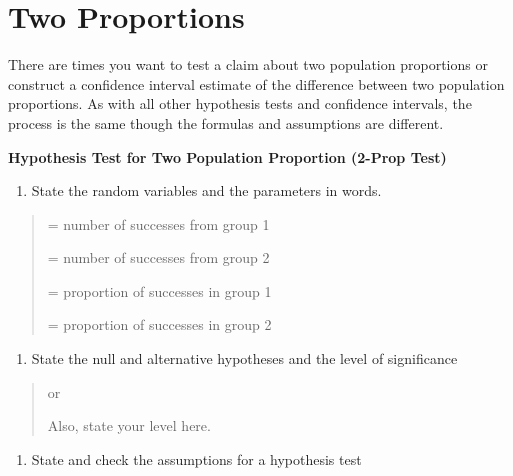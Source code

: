 \documentclass[]{book}
\providecommand{\tightlist}{%
  \setlength{\itemsep}{0pt}\setlength{\parskip}{0pt}}
\begin{document}
\hypertarget{two-proportions}{%
\section{Two Proportions}\label{two-proportions}}

There are times you want to test a claim about two population
proportions or construct a confidence interval estimate of the
difference between two population proportions. As with all other
hypothesis tests and confidence intervals, the process is the same
though the formulas and assumptions are different.

\textbf{Hypothesis Test for Two Population Proportion (2-Prop Test)}

\begin{enumerate}
\def\labelenumi{\arabic{enumi}.}
\tightlist
\item
  State the random variables and the parameters in words.
\end{enumerate}

\begin{quote}
= number of successes from group 1

= number of successes from group 2

= proportion of successes in group 1

= proportion of successes in group 2
\end{quote}

\begin{enumerate}
\def\labelenumi{\arabic{enumi}.}
\setcounter{enumi}{1}
\tightlist
\item
  State the null and alternative hypotheses and the level of
  significance
\end{enumerate}

\begin{quote}
or

Also, state your level here.
\end{quote}

\begin{enumerate}
\def\labelenumi{\arabic{enumi}.}
\setcounter{enumi}{2}
\tightlist
\item
  State and check the assumptions for a hypothesis test
\end{enumerate}
\end{document}
